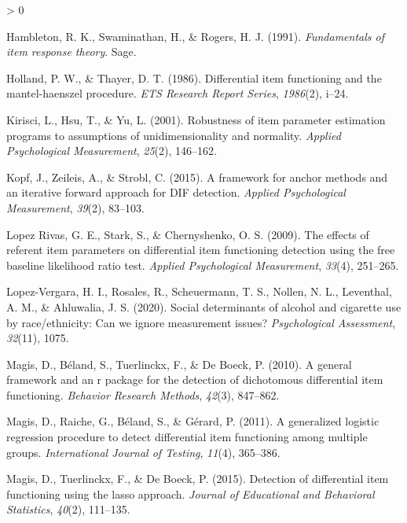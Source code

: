 \documentclass[
  english,
  man,floatsintext]{apa6}
\newlength{\cslhangindent}
\newenvironment{CSLReferences}[2] %
 {%
  \setlength{\parindent}{0pt}
  \ifodd #1 \everypar{\setlength{\hangindent}{\cslhangindent}}\ignorespaces\fi
  \ifnum #2 > 0
  \setlength{\parskip}{#2\baselineskip}
  \fi
 }%
 {}
\begin{document}
\begin{CSLReferences}{1}{0}
\leavevmode\hypertarget{ref-hambleton1991fundamentals}{}%
Hambleton, R. K., Swaminathan, H., \& Rogers, H. J. (1991). \emph{Fundamentals of item response theory}. Sage.

\leavevmode\hypertarget{ref-holland1986differential}{}%
Holland, P. W., \& Thayer, D. T. (1986). Differential item functioning and the mantel-haenszel procedure. \emph{ETS Research Report Series}, \emph{1986}(2), i--24.

\leavevmode\hypertarget{ref-kirisci2001robustness}{}%
Kirisci, L., Hsu, T., \& Yu, L. (2001). Robustness of item parameter estimation programs to assumptions of unidimensionality and normality. \emph{Applied Psychological Measurement}, \emph{25}(2), 146--162.

\leavevmode\hypertarget{ref-kopf2015framework}{}%
Kopf, J., Zeileis, A., \& Strobl, C. (2015). A framework for anchor methods and an iterative forward approach for DIF detection. \emph{Applied Psychological Measurement}, \emph{39}(2), 83--103.

\leavevmode\hypertarget{ref-lopez2009effects}{}%
Lopez Rivas, G. E., Stark, S., \& Chernyshenko, O. S. (2009). The effects of referent item parameters on differential item functioning detection using the free baseline likelihood ratio test. \emph{Applied Psychological Measurement}, \emph{33}(4), 251--265.

\leavevmode\hypertarget{ref-lopez2020social}{}%
Lopez-Vergara, H. I., Rosales, R., Scheuermann, T. S., Nollen, N. L., Leventhal, A. M., \& Ahluwalia, J. S. (2020). Social determinants of alcohol and cigarette use by race/ethnicity: Can we ignore measurement issues? \emph{Psychological Assessment}, \emph{32}(11), 1075.

\leavevmode\hypertarget{ref-magis2010general}{}%
Magis, D., Béland, S., Tuerlinckx, F., \& De Boeck, P. (2010). A general framework and an r package for the detection of dichotomous differential item functioning. \emph{Behavior Research Methods}, \emph{42}(3), 847--862.

\leavevmode\hypertarget{ref-magis2011generalized}{}%
Magis, D., Raiche, G., Béland, S., \& Gérard, P. (2011). A generalized logistic regression procedure to detect differential item functioning among multiple groups. \emph{International Journal of Testing}, \emph{11}(4), 365--386.

\leavevmode\hypertarget{ref-magis2015detection}{}%
Magis, D., Tuerlinckx, F., \& De Boeck, P. (2015). Detection of differential item functioning using the lasso approach. \emph{Journal of Educational and Behavioral Statistics}, \emph{40}(2), 111--135.


\end{CSLReferences}
\end{document}
